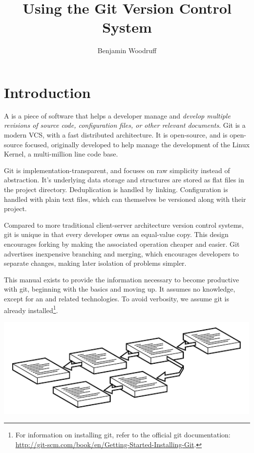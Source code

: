 \documentclass[11pt,letterpaper,twoside]{report}
\title{Using the Git Version Control System}
\author{Benjamin Woodruff}
\begin{document}
\maketitle
\maketoc

\chapter{Introduction}

A  is a piece of software that helps a
developer manage and \emph{develop multiple revisions of source code,
configuration files, or other relevant documents}. Git is a modern VCS, with a
fast distributed architecture. It is open-source, and is open-source focused,
originally developed to help manage the development of the Linux Kernel, a
multi-million line code base.

Git is implementation-transparent, and focuses on raw simplicity instead of
abstraction. It's underlying data storage and structures are stored as flat
files in the project directory. Deduplication is handled by linking.
Configuration is handled with plain text files, which can themselves be
versioned along with their project.

Compared to more traditional client-server architecture version control systems,
git is unique in that every developer owns an equal-value copy. This design
encourages forking by making the associated operation cheaper and easier. Git
advertises inexpensive branching and merging, which encourages developers to
separate changes, making later isolation of problems simpler.

This manual exists to provide the information necessary to become productive
with git, beginning with the basics and moving up. It assumes no knowledge,
except for an  and related technologies.
To avoid verbosity, we assume git is already installed\footnote{For information
on installing git, refer to the official git documentation:
\url{http://git-scm.com/book/en/Getting-Started-Installing-Git}.}.

\vspace{\fill}
\begin{center}
\includegraphics[height=5cm]{resources/branching_abstract.pdf}
\end{center}
\vspace*{\fill}
\end{document}
